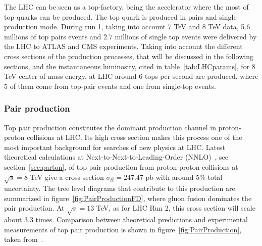 The LHC can be seen as a top-factory, being the accelerator where the most of top-quarks can be produced. The top quark is produced in pairs and single production mode. During run 1, taking into account 7 TeV and 8 TeV data, 5.6 millions of top pairs events and 2.7 millions of single top events were delivered by the LHC to ATLAS and CMS experiments. Taking into account the different cross sections of the production processes, that will be discussed in the following sections, and the instantaneous luminosity, cited in table~\ref{tab:LHCparams}, for 8 TeV center of mass energy, at LHC around 6 tops per second are produced, where 5 of them come from top-pair events and one from single-top events.  

\subsubsection{Pair production}
\label{subsec:toppair}

Top pair production constitutes the dominant production channel in proton-proton collisions at LHC. Its high cross section makes this process one of the most important background for searches of new physics at LHC. Latest theoretical calculations at Next-to-Next-to-Leading-Order (NNLO)~\cite{Czakon:2013goa}, see section~\ref{sec:parton}, of top pair production from proton-proton collisions at $\sqrt{s}=8$ TeV give a cross section $\sigma_{t\bar{t}}=247.47$ pb with around 5\% total uncertainty. The tree level diagrams that contribute to this production are summarized in figure~\ref{fig:PairProductionFD}, where gluon fusion dominates the pair production. At $\sqrt{s}=13$ TeV, as for LHC Run 2, this cross section will scale about 3.3 times. Comparison between theoretical predictions and experimental measurements of top pair production is shown in figure~\ref{fig:PairProduction}, taken from~\cite{TOPLHCWG}.

